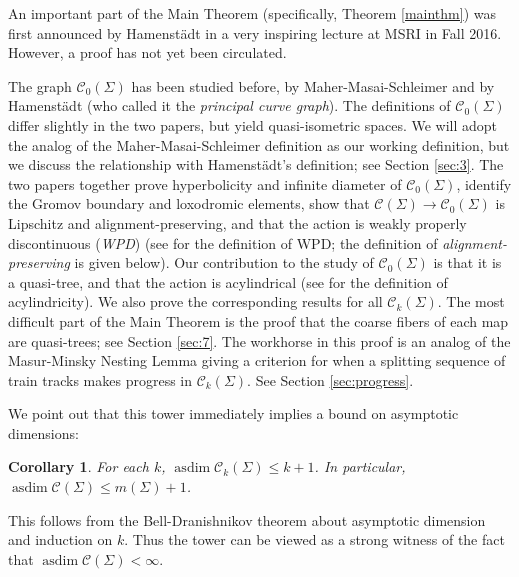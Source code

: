 \documentclass[11pt]{article}
\newtheorem{cor}[thm]{Corollary}
\theoremstyle{remark}
\def\C{{\mathcal C}}
\def\asdim{\operatorname{asdim}}
\begin{document}
An important part of the Main Theorem (specifically,
Theorem \ref{mainthm}) was first announced by Hamenst\"{a}dt in a
very inspiring lecture \cite{ursula-video} at MSRI in Fall
2016.
However, a proof
has not yet been circulated.

The graph $\C_0(\Sigma)$ has been studied before, by Maher-Masai-Schleimer
\cite{MMS2} and by Hamenst\"adt \cite{HamenstadtPrincipal,ursula_random}
(who called it the \emph{principal
  curve graph}). The definitions of $\C_0(\Sigma)$ differ slightly in the two
papers, but yield quasi-isometric spaces. We will adopt the analog of the
Maher-Masai-Schleimer definition as our working definition, but we
discuss the relationship with Hamenst\"adt's definition; see Section
\ref{sec:3}. The two papers together prove hyperbolicity and infinite diameter
of $\C_0(\Sigma)$, identify the Gromov boundary and loxodromic elements,
show that $\C(\Sigma)\to\C_0(\Sigma)$ is
Lipschitz and alignment-preserving, and that the action
is weakly properly discontinuous (\emph{WPD}) (see \cite{BF} for the definition
of WPD; the definition of \emph{alignment-preserving} is given below). Our
contribution to the study of $\C_0(\Sigma)$ is that it is a quasi-tree,
and that the action is acylindrical
(see \cite{bowditch:tight} for the definition of acylindricity).
We also prove the corresponding
results for all $\C_k(\Sigma)$. The most difficult part of the Main Theorem is the
proof that the coarse fibers of each map are quasi-trees; see Section \ref{sec:7}.
The workhorse in
this proof is an analog of the Masur-Minsky Nesting Lemma \cite[Lemma 4.7]{MM} giving a
criterion for when a splitting sequence of train tracks makes progress in
$\C_k(\Sigma)$. See Section \ref{sec:progress}.


We point out that this tower immediately implies
a bound on asymptotic dimensions:
\begin{cor}
  For each $k$, $\asdim \C_k(\Sigma) \leq k+1$. In particular,
  $\asdim \C(\Sigma) \leq m(\Sigma) + 1$.
\end{cor}
\noindent This follows from the Bell-Dranishnikov theorem
\cite{Hurewicz} about asymptotic dimension and induction on $k$.
Thus the tower can be viewed as a strong
witness of the fact that $\asdim\C(\Sigma)<\infty$.
\end{document}
